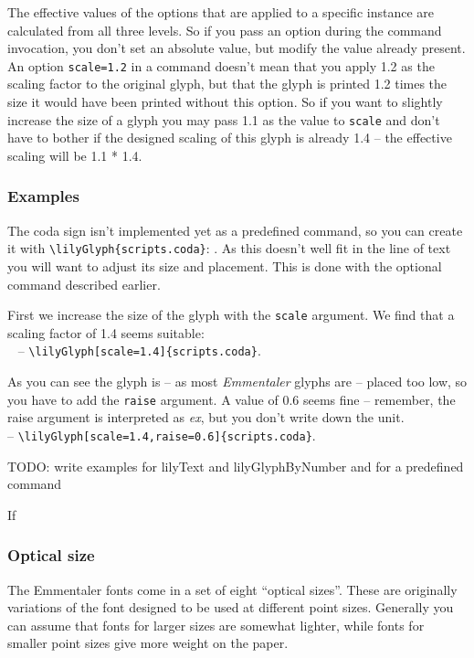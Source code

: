 \documentclass{article}
\newcommand*{\cmd}[1]{\texttt{\textbackslash #1}}
\begin{document}
The effective values of the options that are applied to a specific instance are calculated from all three levels. 
So if you pass an option during the command invocation, you don't set an absolute value, but modify the value already present. 
An option \texttt{scale=1.2} in a command doesn't mean that you apply 1.2 as the scaling factor to the original glyph, but that the glyph is printed 1.2 times the size it would have been printed without this option.
So if you want to slightly increase the size of a glyph you may pass 1.1 as the value to \texttt{scale} and don't have to bother if the designed scaling of this glyph is already 1.4 -- the effective scaling will be 1.1 * 1.4.

\subsubsection{Examples}
The coda sign isn't implemented yet as a predefined command, so you can create it with \cmd{lilyGlyph\{scripts.coda\}}: . 
As this doesn't well fit in the line of text you will want to adjust its size and placement.
This is done with the optional command described earlier.

First we increase the size of the glyph with the \texttt{scale} argument. We find that a scaling factor of 1.4 seems suitable:\\
~ -- \cmd{lilyGlyph[scale=1.4]\{scripts.coda\}}.

As you can see the glyph is -- as most \emph{Emmentaler} glyphs are -- placed too low, so you have to add the \texttt{raise} argument. A value of 0.6 seems fine -- remember, the raise argument is interpreted as \emph{ex}, but you don't write down the unit.\\
 -- \cmd{lilyGlyph[scale=1.4,raise=0.6]\{scripts.coda\}}.

{
\color{red}

\noindent TODO: write examples for lilyText and lilyGlyphByNumber and for a predefined command
}

\bigskip
If

\subsubsection{Optical size}
The Emmentaler fonts come in a set of eight \enquote{optical sizes}.
These are originally variations of the font designed to be used at different point sizes.
Generally you can assume that fonts for larger sizes are somewhat lighter, while fonts for smaller point sizes give more weight on the paper.
\end{document}
